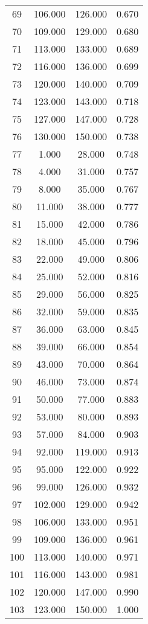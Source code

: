 \begin{tabular}{cccc}
  69 & 106.000 & 126.000 & 0.670 \\ 
  70 & 109.000 & 129.000 & 0.680 \\ 
  71 & 113.000 & 133.000 & 0.689 \\ 
  72 & 116.000 & 136.000 & 0.699 \\ 
  73 & 120.000 & 140.000 & 0.709 \\ 
  74 & 123.000 & 143.000 & 0.718 \\ 
  75 & 127.000 & 147.000 & 0.728 \\ 
  76 & 130.000 & 150.000 & 0.738 \\ 
  77 & 1.000 & 28.000 & 0.748 \\ 
  78 & 4.000 & 31.000 & 0.757 \\ 
  79 & 8.000 & 35.000 & 0.767 \\ 
  80 & 11.000 & 38.000 & 0.777 \\ 
  81 & 15.000 & 42.000 & 0.786 \\ 
  82 & 18.000 & 45.000 & 0.796 \\ 
  83 & 22.000 & 49.000 & 0.806 \\ 
  84 & 25.000 & 52.000 & 0.816 \\ 
  85 & 29.000 & 56.000 & 0.825 \\ 
  86 & 32.000 & 59.000 & 0.835 \\ 
  87 & 36.000 & 63.000 & 0.845 \\ 
  88 & 39.000 & 66.000 & 0.854 \\ 
  89 & 43.000 & 70.000 & 0.864 \\ 
  90 & 46.000 & 73.000 & 0.874 \\ 
  91 & 50.000 & 77.000 & 0.883 \\ 
  92 & 53.000 & 80.000 & 0.893 \\ 
  93 & 57.000 & 84.000 & 0.903 \\ 
  94 & 92.000 & 119.000 & 0.913 \\ 
  95 & 95.000 & 122.000 & 0.922 \\ 
  96 & 99.000 & 126.000 & 0.932 \\ 
  97 & 102.000 & 129.000 & 0.942 \\ 
  98 & 106.000 & 133.000 & 0.951 \\ 
  99 & 109.000 & 136.000 & 0.961 \\ 
  100 & 113.000 & 140.000 & 0.971 \\ 
  101 & 116.000 & 143.000 & 0.981 \\ 
  102 & 120.000 & 147.000 & 0.990 \\ 
  103 & 123.000 & 150.000 & 1.000 \\ 
   \hline
\end{tabular}

